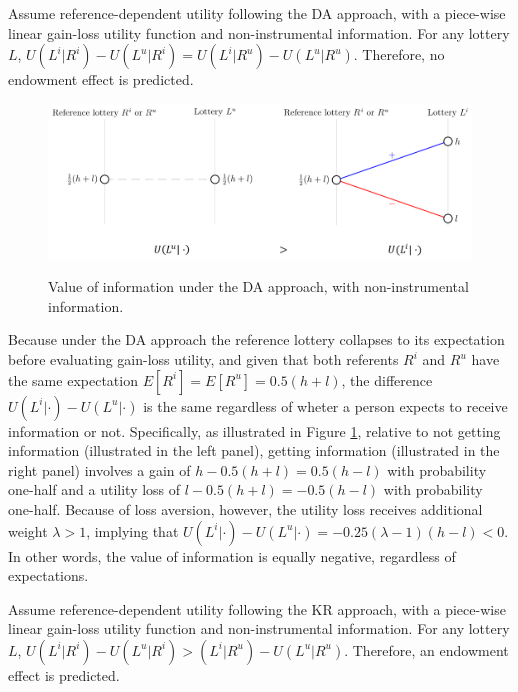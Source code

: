 \begin{prop}
  Assume reference-dependent utility following the DA approach, with a piece-wise linear gain-loss utility function and non-instrumental information. For any lottery $L$, $U(L^i|R^i)-U(L^u|R^i)=U(L^i|R^u)-U(L^u|R^u)$. Therefore, no endowment effect is predicted.
  \label{prop:nonInstrumental-DA}
\end{prop}

\begin{figure}[ht]
  \caption{Value of information under the DA approach, with non-instrumental information.}\label{fig:nonInstrumental-DA}
  \begin{center}
  {\includegraphics[width=1\textwidth]{./figures/theory_fig1.png}}
  \end{center}
\end{figure}

Because under the DA approach the reference lottery collapses to its expectation before evaluating gain-loss utility, and given that both referents $R^i$ and $R^u$ have the same expectation $E[R^i]=E[R^u]=0.5(h+l)$, the difference $U(L^i|\cdot)-U(L^u|\cdot)$ is the same regardless of wheter a person expects to receive information or not. Specifically, as illustrated in Figure \ref{fig:nonInstrumental-DA}, relative to not getting information (illustrated in the left panel), getting information (illustrated in the right panel) involves a gain of $h-0.5(h+l)=0.5(h-l)$ with probability one-half and a utility loss of $l-0.5(h+l)=-0.5(h-l)$ with probability one-half. Because of loss aversion, however, the utility loss receives additional weight $\lambda>1$, implying that $U(L^i|\cdot)-U(L^u|\cdot)=-0.25(\lambda-1)(h-l)<0$. In other words, the value of information is equally negative, regardless of expectations.

\FloatBarrier

\begin{prop}
  Assume reference-dependent utility following the KR approach, with a piece-wise linear gain-loss utility function and non-instrumental information. For any lottery $L$, $U(L^i|R^i)-U(L^u|R^i)>(L^i|R^u)-U(L^u|R^u)$. Therefore, an endowment effect is predicted.
  \label{prop:nonInstrumental-KR}
\end{prop}

